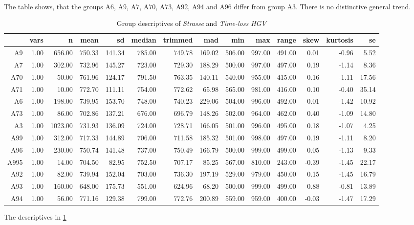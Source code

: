 The table shows, that the groups A6, A9, A7, A70, A73, A92, A94 and A96 differ from group A3. There is no distinctive general trend.
\begin{table}[ht!]
	\tiny
	\centering
  \begin{tabular}{rrrrrrrrrrrrrr}
    \hline
    & vars & n & mean & sd & median & trimmed & mad & min & max & range & skew & kurtosis & se \\ 
    \hline
    A9   & 1.00 & 656.00 & 750.33 & 141.34 & 785.00 & 749.78 & 169.02 & 506.00 & 997.00 & 491.00 & 0.01 & -0.96 & 5.52 \\ 
    A7   & 1.00 & 302.00 & 732.96 & 145.27 & 723.00 & 729.30 & 188.29 & 500.00 & 997.00 & 497.00 & 0.19 & -1.14 & 8.36 \\ 
    A70  & 1.00 & 50.00 & 761.96 & 124.17 & 791.50 & 763.35 & 140.11 & 540.00 & 955.00 & 415.00 & -0.16 & -1.11 & 17.56 \\ 
    A71  & 1.00 & 10.00 & 772.70 & 111.11 & 754.00 & 772.62 & 65.98 & 565.00 & 981.00 & 416.00 & 0.10 & -0.40 & 35.14 \\ 
    A6   & 1.00 & 198.00 & 739.95 & 153.70 & 748.00 & 740.23 & 229.06 & 504.00 & 996.00 & 492.00 & -0.01 & -1.42 & 10.92 \\ 
    A73  & 1.00 & 86.00 & 702.86 & 137.21 & 676.00 & 696.79 & 148.26 & 502.00 & 964.00 & 462.00 & 0.40 & -1.09 & 14.80 \\ 
    A3   & 1.00 & 1023.00 & 731.93 & 136.09 & 724.00 & 728.71 & 166.05 & 501.00 & 996.00 & 495.00 & 0.18 & -1.07 & 4.25 \\ 
    A99  & 1.00 & 312.00 & 717.33 & 144.89 & 706.00 & 711.58 & 185.32 & 501.00 & 998.00 & 497.00 & 0.19 & -1.11 & 8.20 \\ 
    A96  & 1.00 & 230.00 & 750.74 & 141.48 & 737.00 & 750.49 & 166.79 & 500.00 & 999.00 & 499.00 & 0.05 & -1.13 & 9.33 \\ 
    A995 & 1.00 & 14.00 & 704.50 & 82.95 & 752.50 & 707.17 & 85.25 & 567.00 & 810.00 & 243.00 & -0.39 & -1.45 & 22.17 \\ 
    A92  & 1.00 & 82.00 & 739.94 & 152.04 & 703.00 & 736.30 & 197.19 & 529.00 & 979.00 & 450.00 & 0.15 & -1.45 & 16.79 \\ 
    A93  & 1.00 & 160.00 & 648.00 & 175.73 & 551.00 & 624.96 & 68.20 & 500.00 & 999.00 & 499.00 & 0.88 & -0.81 & 13.89 \\ 
    A94  & 1.00 & 56.00 & 771.16 & 129.38 & 799.00 & 772.76 & 200.89 & 559.00 & 959.00 & 400.00 & -0.03 & -1.47 & 17.29 \\ 
    \hline
  \end{tabular}
	\caption{Group descriptives of \textit{Strasse} and \textit{Time-loss HGV}}
	\label{tbl:descriptives_arbis_matched_Strasse_TMax}
\end{table}
The descriptives in \cref{tbl:descriptives_arbis_matched_Strasse_TMax}

